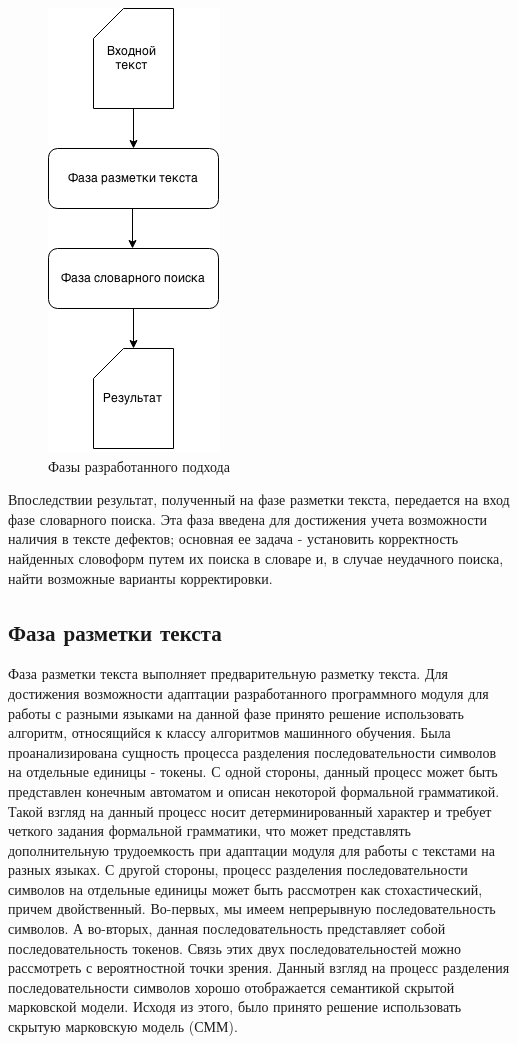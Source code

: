 \begin{figure}[H]
	\centering
	\includegraphics[scale=0.7]{img/approach.png}
	\caption{Фазы разработанного подхода}
\end{figure}
Впоследствии результат, полученный на фазе разметки текста, передается на вход фазе словарного поиска. Эта фаза введена для достижения учета возможности наличия в тексте дефектов; основная ее задача - установить корректность найденных словоформ путем их поиска в словаре и, в случае неудачного поиска, найти возможные варианты корректировки.

\subsection{Фаза разметки текста}
Фаза разметки текста выполняет предварительную разметку текста. Для достижения возможности адаптации разработанного программного модуля для работы с разными языками на данной фазе принято решение использовать алгоритм, относящийся к классу алгоритмов машинного обучения. Была проанализирована сущность процесса разделения последовательности символов на отдельные единицы - токены. С одной стороны, данный процесс может быть представлен конечным автоматом и описан некоторой формальной грамматикой. Такой взгляд на данный процесс носит детерминированный характер и требует четкого задания формальной грамматики, что может представлять дополнительную трудоемкость при адаптации модуля для работы с текстами на разных языках. С другой стороны, процесс разделения последовательности символов на отдельные единицы может быть рассмотрен как стохастический, причем двойственный. Во-первых, мы имеем непрерывную последовательность символов. А во-вторых, данная последовательность представляет собой последовательность токенов. Связь этих двух последовательностей можно рассмотреть с вероятностной точки зрения. Данный взгляд на процесс разделения последовательности символов хорошо отображается семантикой скрытой марковской модели. Исходя из этого, было принято решение использовать скрытую марковскую модель (СММ). 

